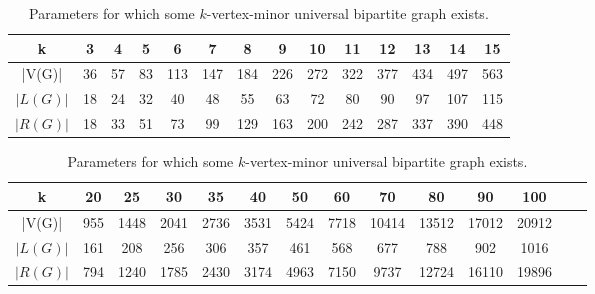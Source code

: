 \documentclass[a4paper,UKenglish,cleveref, autoref, thm-restate]{arxiv}
\begin{document}
\begin{table}[ht]
    \centering
    \caption{Parameters for which some $k$-vertex-minor universal bipartite graph exists. }
    \begin{tabular}{|c|c|c|c|c|c|c|c|c|c|c|c|c|c|}
        \hline
        k               & 3  & 4  & 5  & 6  & 7  & 8  & 9  & 10  & 11  & 12  & 13  & 14  & 15  \\
        \hline
        |V(G)|  & 36  & 57  & 83  & 113  & 147  & 184  & 226  & 272  & 322  & 377  & 434  & 497  & 563 \\
        \hline
        $|L(G)|$  & 18  & 24  & 32  & 40  & 48  & 55  & 63  & 72  & 80  & 90  & 97  & 107  & 115 \\
        \hline
        $|R(G)|$ & 18  & 33  & 51  & 73  & 99  & 129  & 163  & 200  & 242  & 287  & 337  & 390  & 448 \\
        \hline
    \end{tabular}

    \bigskip

    \begin{tabular}{|c|c|c|c|c|c|c|c|c|c|c|c|c|c|}
        \hline
        k    & 20  & 25  & 30  & 35  & 40  & 50  & 60  & 70  & 80  & 90  & 100 \\
        \hline
        |V(G)|  & 955  & 1448  & 2041  & 2736  & 3531  & 5424  & 7718  & 10414  & 13512  & 17012  & 20912 \\
        \hline
        $|L(G)|$  & 161  & 208  & 256  & 306  & 357  & 461  & 568  & 677  & 788  & 902  & 1016 \\
        \hline
        $|R(G)|$  & 794  & 1240  & 1785  & 2430  & 3174  & 4963  & 7150  & 9737  & 12724  & 16110  & 19896 \\
        \hline
    \end{tabular}

    \label{tab:exists_kvmu}

\end{table}
\end{document}
